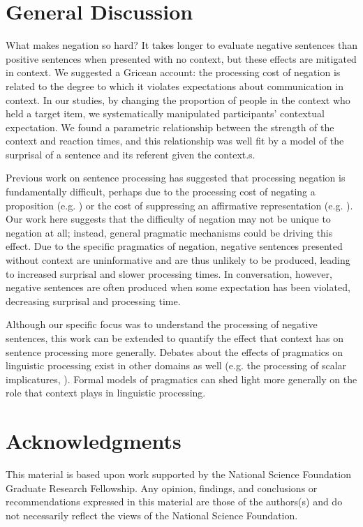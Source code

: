 \documentclass[10pt,letterpaper]{article}
\begin{document}
\section{General Discussion}

What makes negation so hard? It takes longer to evaluate negative sentences than positive sentences when presented with no context, but these effects are mitigated in context. We suggested a Gricean account: the processing cost of negation is related to the degree to which it violates expectations about communication in context. In our studies, by changing the proportion of people in the context who held a target item, we systematically manipulated participants' contextual expectation.  We found a parametric relationship between the strength of the context and reaction times, and this relationship was well fit by a model of the surprisal of a sentence and its referent given the context.s.  

Previous work on sentence processing has suggested that processing negation is fundamentally difficult, perhaps due to the processing cost of negating a proposition (e.g. ) or the cost of suppressing an affirmative representation (e.g. ).  Our work here suggests that the difficulty of negation may not be unique to negation at all; instead, general pragmatic mechanisms could be driving this effect.  Due to the specific pragmatics of negation, negative sentences presented without context are uninformative and are thus unlikely to be produced, leading to increased surprisal and slower processing times.  In conversation, however, negative sentences are often produced when some expectation has been violated, decreasing surprisal and processing time.  

Although our specific focus was to understand the processing of negative sentences, this work can be extended to quantify the effect that context has on sentence processing more generally.  Debates about the effects of pragmatics on linguistic processing exist in other domains as well (e.g. the processing of scalar implicatures, ).  Formal models of pragmatics can shed light more generally on the role that context plays in linguistic processing. 

\section{Acknowledgments}
This material is based upon work supported by the National Science Foundation Graduate Research Fellowship. Any opinion, findings, and conclusions or recommendations expressed in this material are those of the authors(s) and do not necessarily reflect the views of the National Science Foundation.




\setlength{\bibleftmargin}{.125in}
\setlength{\bibindent}{-\bibleftmargin}


\end{document}
